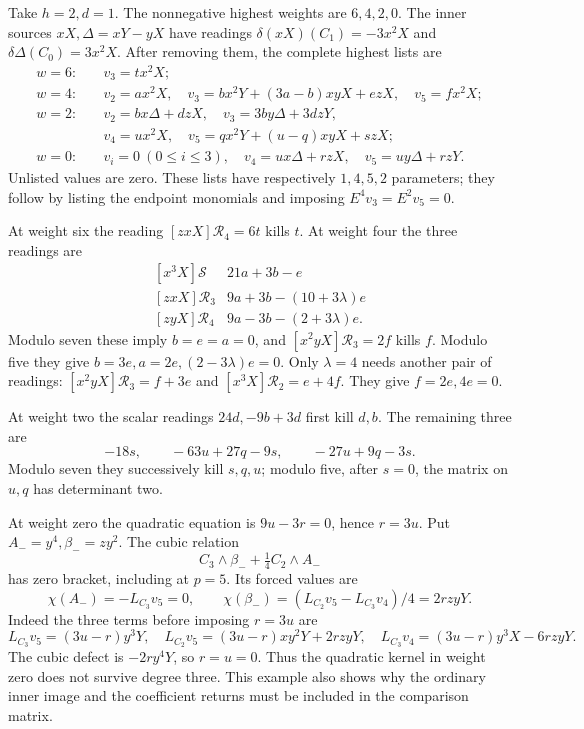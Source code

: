\documentclass[11pt]{article}
\theoremstyle{plain}
\theoremstyle{definition}
\theoremstyle{remark}
\numberwithin{equation}{section}
\begin{document}
Take \(h=2,d=1\). The nonnegative highest weights are
\(6,4,2,0\). The inner sources \(xX,\Delta=xY-yX\) have readings
\(\delta(xX)(C_1)=-3x^2X\) and
\(\delta\Delta(C_0)=3x^2X\). After removing them, the complete
highest lists are
\begin{align*}
 w=6:&\quad v_3=tx^2X;\\
 w=4:&\quad v_2=ax^2X,\quad
 v_3=bx^2Y+(3a-b)xyX+ezX,\quad v_5=fx^2X;\\
 w=2:&\quad v_2=bx\Delta+dzX,\quad
 v_3=3by\Delta+3dzY,\\
 &\quad v_4=ux^2X,\quad v_5=qx^2Y+(u-q)xyX+szX;\\
 w=0:&\quad v_i=0\ (0\le i\le3),\quad
 v_4=ux\Delta+rzX,\quad v_5=uy\Delta+rzY.
\end{align*}
Unlisted values are zero. These lists have respectively
\(1,4,5,2\) parameters; they follow by listing the endpoint
monomials and imposing \(E^4v_3=E^2v_5=0\).

At weight six the reading \([zxX]\mathcal R_4=6t\) kills \(t\).
At weight four the three readings are
\[
\begin{array}{c|l}
 {[x^3X]}\mathcal S&21a+3b-e\\
 {[zxX]}\mathcal R_3&9a+3b-(10+3\lambda)e\\
 {[zyX]}\mathcal R_4&9a-3b-(2+3\lambda)e.
\end{array}
\]
Modulo seven these imply \(b=e=a=0\), and
\([x^2yX]\mathcal R_3=2f\) kills \(f\).
Modulo five they give \(b=3e,a=2e,(2-3\lambda)e=0\).
Only \(\lambda=4\) needs another pair of readings:
\([x^2yX]\mathcal R_3=f+3e\) and
\([x^3X]\mathcal R_2=e+4f\). They give \(f=2e,4e=0\).

At weight two the scalar readings \(24d,-9b+3d\) first kill
\(d,b\). The remaining three are
\[
 -18s,\qquad -63u+27q-9s,\qquad -27u+9q-3s.
\]
Modulo seven they successively kill \(s,q,u\); modulo five,
after \(s=0\), the matrix on \(u,q\) has determinant two.

At weight zero the quadratic equation is \(9u-3r=0\), hence
\(r=3u\). Put \(A_-=y^4,\beta_-=zy^2\). The cubic relation
\[
 C_3\wedge\beta_-+\tfrac14 C_2\wedge A_-
\]
has zero bracket, including at \(p=5\).
Its forced values are
\[
 \chi(A_-)=-L_{C_3}v_5=0,\qquad
 \chi(\beta_-)=(L_{C_2}v_5-L_{C_3}v_4)/4=2rzyY.
\]
Indeed the three terms before imposing \(r=3u\) are
\[
 L_{C_3}v_5=(3u-r)y^3Y,\quad
 L_{C_2}v_5=(3u-r)xy^2Y+2rzyY,\quad
 L_{C_3}v_4=(3u-r)y^3X-6rzyY.
\]
The cubic defect is \(-2ry^4Y\), so \(r=u=0\).
Thus the quadratic kernel in weight zero does not survive degree
three. This example also shows why the ordinary inner image and the
coefficient returns must be included in the comparison matrix.
\end{document}
